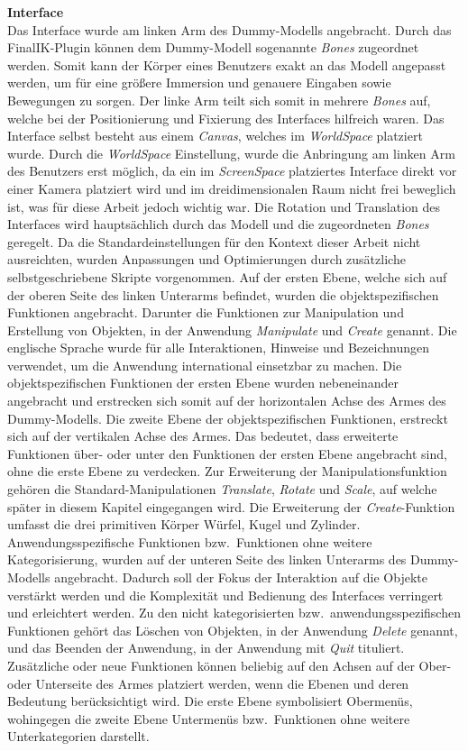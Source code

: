 \noindent \textbf{Interface}\\
Das Interface wurde am linken Arm des Dummy-Modells angebracht. Durch das FinalIK-Plugin können dem Dummy-Modell sogenannte \textit{Bones} zugeordnet werden. Somit kann der Körper eines Benutzers exakt an das Modell angepasst werden, um für eine größere Immersion und genauere Eingaben sowie Bewegungen zu sorgen. Der linke Arm teilt sich somit in mehrere \textit{Bones} auf, welche bei der Positionierung und Fixierung des Interfaces hilfreich waren. Das Interface selbst besteht aus einem \textit{Canvas}, welches im \textit{WorldSpace} platziert wurde. Durch die \textit{WorldSpace} Einstellung, wurde die Anbringung am linken Arm des Benutzers erst möglich, da ein im \textit{ScreenSpace} platziertes Interface direkt vor einer Kamera platziert wird und im dreidimensionalen Raum nicht frei beweglich ist, was für diese Arbeit jedoch wichtig war. Die Rotation und Translation des Interfaces wird hauptsächlich durch das Modell und die zugeordneten \textit{Bones} geregelt. Da die Standardeinstellungen für den Kontext dieser Arbeit nicht ausreichten, wurden Anpassungen und Optimierungen durch zusätzliche selbstgeschriebene Skripte vorgenommen. Auf der ersten Ebene, welche sich auf der oberen Seite des linken Unterarms befindet, wurden die objektspezifischen Funktionen angebracht. Darunter die Funktionen zur Manipulation und Erstellung von Objekten, in der Anwendung \textit{Manipulate} und \textit{Create} genannt. Die englische Sprache wurde für alle Interaktionen, Hinweise und Bezeichnungen verwendet, um die Anwendung international einsetzbar zu machen. Die objektspezifischen Funktionen der ersten Ebene wurden nebeneinander angebracht und erstrecken sich somit auf der horizontalen Achse des Armes des Dummy-Modells. Die zweite Ebene der objektspezifischen Funktionen, erstreckt sich auf der vertikalen Achse des Armes. Das bedeutet, dass erweiterte Funktionen über- oder unter den Funktionen der ersten Ebene angebracht sind, ohne die erste Ebene zu verdecken. Zur Erweiterung der Manipulationsfunktion gehören die Standard-Manipulationen \textit{Translate}, \textit{Rotate} und \textit{Scale}, auf welche später in diesem Kapitel eingegangen wird. Die Erweiterung der \textit{Create}-Funktion umfasst die drei primitiven Körper Würfel, Kugel und Zylinder. Anwendungsspezifische Funktionen bzw.~Funktionen ohne weitere Kategorisierung, wurden auf der unteren Seite des linken Unterarms des Dummy-Modells angebracht. Dadurch soll der Fokus der Interaktion auf die Objekte verstärkt werden und die Komplexität und Bedienung des Interfaces verringert und erleichtert werden. Zu den nicht kategorisierten bzw.~anwendungsspezifischen Funktionen gehört das Löschen von Objekten, in der Anwendung \textit{Delete} genannt, und das Beenden der Anwendung, in der Anwendung mit \textit{Quit} tituliert. Zusätzliche oder neue Funktionen können beliebig auf den Achsen auf der Ober- oder Unterseite des Armes platziert werden, wenn die Ebenen und deren Bedeutung berücksichtigt wird. Die erste Ebene symbolisiert Obermenüs, wohingegen die zweite Ebene Untermenüs bzw.~Funktionen ohne weitere Unterkategorien darstellt.\\

